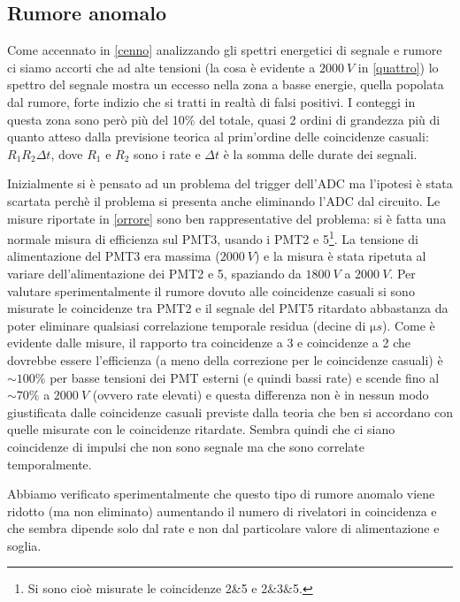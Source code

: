 \subsection{Rumore anomalo}
\label{rumore}

Come accennato in \autoref{cenno} analizzando gli spettri energetici di segnale e rumore ci siamo accorti che ad alte tensioni (la cosa è evidente a $\SI{2000}{V}$ in \autoref{quattro}) lo spettro del segnale mostra un eccesso nella zona a basse energie, quella popolata dal rumore, forte indizio che si tratti in realtà di falsi positivi. I conteggi in questa zona sono però più del 10\% del totale, quasi 2 ordini di grandezza più di quanto atteso dalla previsione teorica al prim'ordine delle coincidenze casuali: $R_1 R_2 \Delta t$, dove $R_1$ e $R_2$ sono i rate e $\Delta t$ è la somma delle durate dei segnali.

Inizialmente si è pensato ad un problema del trigger dell'ADC ma l'ipotesi è stata scartata perchè il problema si presenta anche eliminando l'ADC dal circuito. Le misure riportate in \autoref{orrore} sono ben rappresentative del problema: si è fatta una normale misura di efficienza sul PMT3, usando i PMT2 e 5\footnote{Si sono cioè misurate le coincidenze 2\&5 e 2\&3\&5.}. La tensione di alimentazione del PMT3 era massima ($\SI{2000}{V}$) e la misura è stata ripetuta al variare dell'alimentazione dei PMT2 e 5, spaziando da $\SI{1800}{V}$ a $\SI{2000}{V}$. Per valutare sperimentalmente il rumore dovuto alle coincidenze casuali si sono misurate le coincidenze tra PMT2 e il segnale del PMT5 ritardato abbastanza da poter eliminare qualsiasi correlazione temporale residua (decine di $\si{\micro s}$).
Come è evidente dalle misure, il rapporto tra coincidenze a 3 e coincidenze a 2 che dovrebbe essere l'efficienza (a meno della correzione per le coincidenze casuali) è $\sim 100\%$ per basse tensioni dei PMT esterni (e quindi bassi rate) e scende fino al $\sim 70\%$ a $\SI{2000}{V}$ (ovvero rate elevati) e questa differenza non è in nessun modo giustificata dalle coincidenze casuali previste dalla teoria che ben si accordano con quelle misurate con le coincidenze ritardate. Sembra quindi che ci siano coincidenze di impulsi che non sono segnale ma che sono correlate temporalmente.

Abbiamo verificato sperimentalmente che questo tipo di rumore anomalo viene ridotto (ma non eliminato) aumentando il numero di rivelatori in coincidenza e che sembra dipende solo dal rate e non dal particolare valore di alimentazione e soglia.

